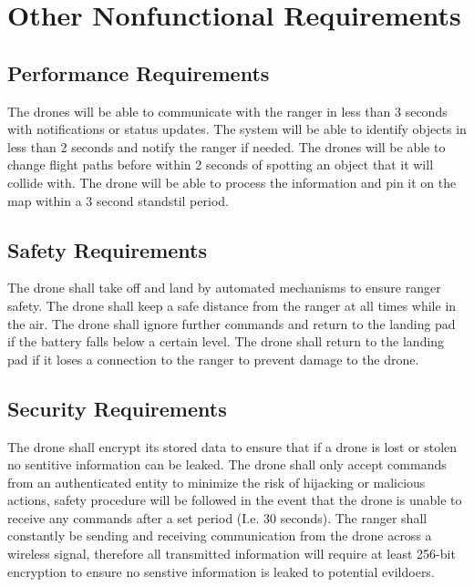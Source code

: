 \chapter{Other Nonfunctional Requirements}

\section{Performance Requirements}
The drones will be able to communicate with the ranger in less than 3 seconds with notifications or status updates.
\newline
The system will be able to identify objects in less than 2 seconds and notify the ranger if needed.
\newline
The drones will be able to change flight paths before within 2 seconds of spotting an object that it will collide with.
\newline
The drone will be able to process the information and pin it on the map within a 3 second standstil period.
\newline

\section{Safety Requirements}
The drone shall take off and land by automated mechanisms to ensure ranger safety.
\newline
The drone shall keep a safe distance from the ranger at all times while in the air.
\newline
The drone shall ignore further commands and return to the landing pad if the battery falls below a certain level.
\newline
The drone shall return to the landing pad if it loses a connection to the ranger to prevent damage to the drone.
\newline

\section{Security Requirements}
The drone shall encrypt its stored data to ensure that if a drone is lost or stolen no sentitive information can be leaked.
\newline
The drone shall only accept commands from an authenticated entity to minimize the risk of hijacking or malicious actions, 
safety procedure will be followed in the event that the drone is unable to receive any commands after a set period (I.e. 30 seconds).
\newline
The ranger shall constantly be sending and receiving communication from the drone across a wireless signal,
therefore all transmitted information will require at least 256-bit encryption to ensure no senstive information is leaked to potential evildoers.
\newline

